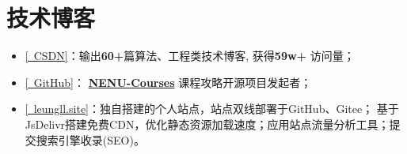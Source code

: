 \documentclass{resume}
\begin{document}
\section{技术博客}
\begin{itemize}[parsep=0.3ex] \normalsize
    \item \href{https://blog.csdn.net/liangllhahaha?type=blog}{[\faArrowRight \ CSDN]}：输出\textbf{60+}篇算法、工程类技术博客, 
    获得\textbf{59w+} 访问量；

    \item \href{https://github.com/leungll}{[\faGithub \ GitHub]}：
    \href{https://github.com/leungll/NENU-Courses}{\textbf{NENU-Courses}} 课程攻略开源项目发起者；

    \item \href{https://leungll.site/about}{[\faArrowRight \ leungll.site]}：独自搭建的个人站点，站点双线部署于GitHub、Gitee；
    基于JsDelivr搭建免费CDN，优化静态资源加载速度；应用站点流量分析工具；提交搜索引擎收录(SEO)。
\end{itemize}
\end{document}
